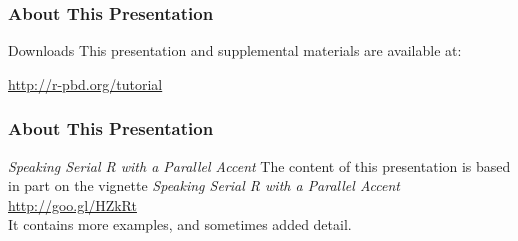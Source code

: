 \frame{
  \maketitle
}


\begin{frame}
\frametitle{About This Presentation}
 \begin{block}{Downloads}
  This presentation and supplemental materials are available at:
  \begin{center}
  \url{http://r-pbd.org/tutorial}
  \end{center}
 \end{block}
\end{frame}


\begin{frame}
\frametitle{About This Presentation}
 \begin{block}{\emph{Speaking Serial R with a Parallel Accent}}
  The content of this presentation is based in part on the  
vignette \emph{Speaking Serial R with a Parallel Accent}\\[.4cm]
  \url{http://goo.gl/HZkRt}\\[.4cm]
  It contains more examples, and sometimes added detail.
 \end{block}
\end{frame}



